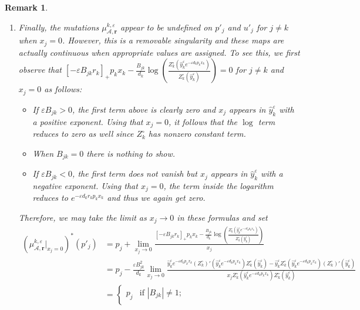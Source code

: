\documentclass{amsart}
\newtheorem{remark}[theorem]{Remark}
\numberwithin{equation}{section}
\newcommand{\bfr}{{\boldsymbol{r}}}
\newcommand{\cA}{\mathcal{A}}
\newcommand{\CC}{\mathbb{C}}
\begin{document}
\begin{remark}
\begin{enumerate}
      Away from these loci in the complex case, the identity image can again be used to define a splitting of the $d_k$-fold covering map from $\CC_\times$ to $\CC_\times$.
    \item Finally, the mutations $\mu_{\cA,\bfr}^{k,\varepsilon}$ appear to be undefined on $p'_j$ and $u'_j$ for $j\ne k$ when $x_j=0$.
      However, this is a removable singularity and these maps are actually continuous when appropriate values are assigned.
      To see this, we first observe that $[-\varepsilon B_{jk} r_k]_+ p_k x_k - \frac{B_{jk}}{d_k}\log\left(\frac{Z_k^\circ(\hat y_k^\varepsilon e^{-\varepsilon d_kp_kx_k})}{Z_k^\circ(\hat y_k^\varepsilon)}\right)=0$ for $j\ne k$ and $x_j=0$ as follows:
      \begin{itemize}
        \item If $\varepsilon B_{jk}>0$, the first term above is clearly zero and $x_j$ appears in $\hat y_k^\varepsilon$ with a positive exponent.
          Using that $x_j=0$, it follows that the $\log$ term reduces to zero as well since $Z_k^\circ$ has nonzero constant term.
        \item When $B_{jk}=0$ there is nothing to show.
        \item If $\varepsilon B_{jk}<0$, the first term does not vanish but $x_j$ appears in $\hat y_k^\varepsilon$ with a negative exponent.
          Using that $x_j=0$, the term inside the logarithm reduces to $e^{-\varepsilon d_k r_k p_k x_k}$ and thus we again get zero.
      \end{itemize}
      Therefore, we may take the limit as $x_j\to0$ in these formulas and set
      \begin{align*}
        (\mu_{\cA,\bfr}^{k,\varepsilon}|_{x_j=0})^*(p'_j)
        &=p_j+\lim_{x_j \to 0}\frac{[-\varepsilon B_{jk} r_k]_+ p_k x_k - \frac{B_{jk}}{d_k}\log\left(\frac{Z_k^\circ(\hat y_k^\varepsilon e^{-\varepsilon d_kp_kx_k})}{Z_k^\circ(\hat y_k^\varepsilon)}\right)}{x_j}\\
        &=p_j-\frac{\varepsilon B_{jk}^2}{d_k} \lim_{x_j\to 0} \frac{ \hat y_k^\varepsilon e^{-\varepsilon d_kp_kx_k} (Z_k^\circ)'(\hat y_k^\varepsilon e^{-\varepsilon d_kp_kx_k}) Z_k^\circ(\hat y_k^\varepsilon) - \hat y_k^\varepsilon Z_k^\circ(\hat y_k^\varepsilon e^{-\varepsilon d_kp_kx_k}) (Z_k^\circ)'(\hat y_k^\varepsilon) }{ x_j Z_k^\circ(\hat y_k^\varepsilon e^{-\varepsilon d_kp_kx_k}) Z_k^\circ(\hat y_k^\varepsilon) }\\
        &=\begin{cases} 
          p_j & \text{if $|B_{jk}| \ne 1$;}\\ 

\end{cases}
\end{align*}
\end{enumerate}
\end{remark}
\end{document}
